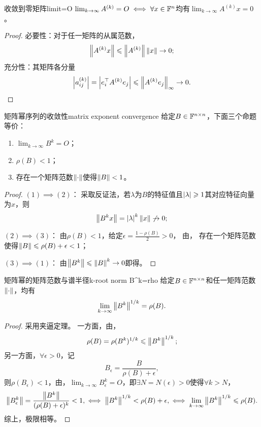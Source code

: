 \begin{theorem}
    {收敛到零矩阵}{limit=O}
    $\lim_{k\to\infty}A^{(k)}=O\iff\forall x\in\mathbb F^n$均有$\lim_{k\to\infty}A^{(k)}x=0$。
\end{theorem}

\begin{proof}
    必要性：对于任一矩阵的从属范数，
    \[
        \left\lVert A^{(k)}x\right\rVert\leqslant\left\lVert A^{(k)}\right\rVert\left\lVert x\right\rVert\to0;
    \]
    充分性：其矩阵各分量
    \[
        \left\lvert a_{ij}^{(k)}\right\rvert=\left\lvert e_i^\top A^{(k)}e_j\right\rvert\leqslant\left\lVert A^{(k)}e_j\right\rVert_\infty\to 0.
        \qedhere
    \]
\end{proof}

\begin{theorem}
    {矩阵幂序列的收敛性}{matrix exponent convergence}
    给定$B\in\mathbb F^{n\times n}$，下面三个命题等价：
    \begin{enumerate}
        \item $\lim_{k\to\infty}B^k=O$；
        \item $\rho(B)<1$；
        \item 存在一个矩阵范数$\left\lVert\cdot\right\rVert$使得$\left\lVert B\right\rVert<1$。
    \end{enumerate}
\end{theorem}

\begin{proof}
    $(1)\implies(2)$：
    采取反证法，若$\lambda$为$B$的特征值且$\left\lvert\lambda\right\rvert\geqslant 1$其对应特征向量为$x$，则 
    \[
        \left\lVert B^kx\right\rVert=\left\lvert\lambda\right\rvert^k\left\lVert x\right\rVert\not\to 0;
    \]

    $(2)\implies(3)$：
    由$\rho(B)<1$，给定$\epsilon=\frac{1-\rho(B)}2>0$，
    由，
    存在一个矩阵范数使得$\left\lVert B\right\rVert\leqslant\rho(B)+\epsilon<1$；

    $(3)\implies(1)$：
    由$\left\lVert B^k\right\rVert\leqslant\left\lVert B\right\rVert^k\to0$即得。
\end{proof}

\begin{theorem}
    {矩阵幂的矩阵范数与谱半径}{k-root norm B^k=rho}
    给定$B\in\mathbb F^{n\times n}$和任一矩阵范数$\left\lVert\cdot\right\rVert$，均有
    \begin{equation}
        \lim_{k\to\infty}\left\lVert B^k\right\rVert^{1/k}=\rho(B).
    \end{equation}
\end{theorem}

\begin{proof}
    采用夹逼定理。
    一方面，由，
    \[
        \rho(B)=\rho(B^k)^{1/k}\leqslant\left\lVert B^k\right\rVert^{1/k};
    \]
    另一方面，$\forall\epsilon>0$，记 
    \[
        B_\epsilon=\frac{B}{\rho(B)+\epsilon},
    \]
    则$\rho(B_\epsilon)<1$，由，$\lim_{k\to\infty}B_\epsilon^k=O$，即$\exists N=N(\epsilon)>0$使得$\forall k>N$，
    \[
        \left\lVert B_\epsilon^k\right\rVert=\frac{\left\lVert B^k\right\rVert}{(\rho(B)+\epsilon)^k}<1,\iff\left\lVert B^k\right\rVert^{1/k}<\rho(B)+\epsilon,\iff\lim_{k\to\infty}\left\lVert B^k\right\rVert^{1/k}\leqslant\rho(B).
    \]
    综上，极限相等。    
\end{proof}

